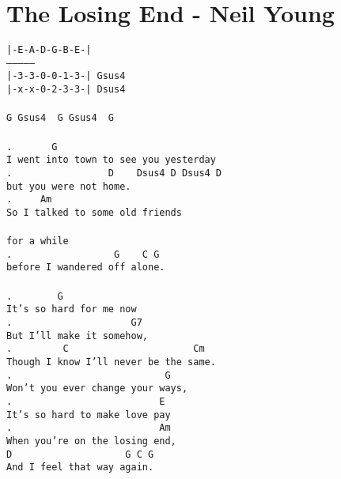 \newpage
\section{The Losing End - Neil Young}
\label{The Losing End - Neil Young}
\texttt{|-E-A-D-G-B-E-|\\
---------------\\
|-3-3-0-0-1-3-| Gsus4\\
|-x-x-0-2-3-3-| Dsus4\\
\\
G\ Gsus4\ \ G\ Gsus4\ \ G\\
\\
.\ \ \ \ \ \ \ G\\
I\ went\ into\ town\ to\ see\ you\ yesterday\\
.\ \ \ \ \ \ \ \ \ \ \ \ \ \ \ \ \ D\ \ \ \ Dsus4\ D\ Dsus4\ D\\
but\ you\ were\ not\ home.\\
.\ \ \ \ \ Am\\
So\ I\ talked\ to\ some\ old\ friends\\
\\
for\ a\ while\\
.\ \ \ \ \ \ \ \ \ \ \ \ \ \ \ \ \ \ G\ \ \ \ C\ G\\
before\ I\ wandered\ off\ alone.\\
\\
.\ \ \ \ \ \ \ \ G\\
It's\ so\ hard\ for\ me\ now\\
.\ \ \ \ \ \ \ \ \ \ \ \ \ \ \ \ \ \ \ \ \ G7\\
But\ I'll\ make\ it\ somehow,\\
.\ \ \ \ \ \ \ \ \ C\ \ \ \ \ \ \ \ \ \ \ \ \ \ \ \ \ \ \ \ \ \ Cm\\
Though\ I\ know\ I'll\ never\ be\ the\ same.\\
.\ \ \ \ \ \ \ \ \ \ \ \ \ \ \ \ \ \ \ \ \ \ \ \ \ \ \ G\\
Won't\ you\ ever\ change\ your\ ways,\\
.\ \ \ \ \ \ \ \ \ \ \ \ \ \ \ \ \ \ \ \ \ \ \ \ \ \ E\\
It's\ so\ hard\ to\ make\ love\ pay\\
.\ \ \ \ \ \ \ \ \ \ \ \ \ \ \ \ \ \ \ \ \ \ \ \ \ \ Am\\
When\ you're\ on\ the\ losing\ end,\\
D\ \ \ \ \ \ \ \ \ \ \ \ \ \ \ \ \ \ \ \ G\ C\ G\\
And\ I\ feel\ that\ way\ again.\\
\\
}
